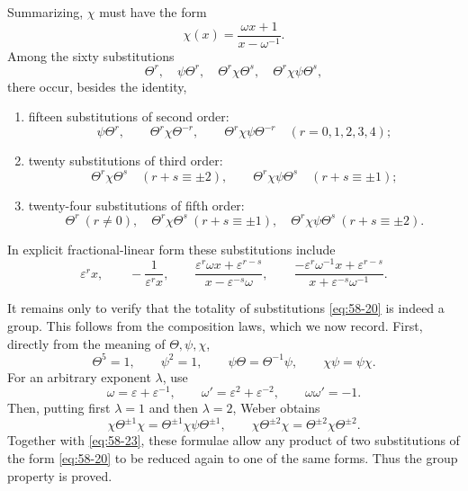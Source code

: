 \documentclass[11pt,a4paper]{book}
\newcommand{\eps}{\varepsilon}
\begin{document}
Summarizing, \(\chi\) must have the form
\begin{equation}\label{eq:58-19}
 \chi(x)=\frac{\omega x+1}{x-\omega^{-1}}.
\end{equation}
Among the sixty substitutions
\begin{equation}\label{eq:58-20}
 \Theta^r,
 \quad \psi\Theta^r,
 \quad \Theta^r\chi\Theta^s,
 \quad \Theta^r\chi\psi\Theta^s,
\end{equation}
there occur, besides the identity,
\begin{enumerate}[label=\arabic*.]
\item fifteen substitutions of second order:
\[
 \psi\Theta^r,
 \qquad \Theta^r\chi\Theta^{-r},
 \qquad \Theta^r\chi\psi\Theta^{-r}
 \quad (r=0,1,2,3,4);
\]
\item twenty substitutions of third order:
\[
 \Theta^r\chi\Theta^s\quad(r+s\equiv\pm2),
 \qquad
 \Theta^r\chi\psi\Theta^s\quad(r+s\equiv\pm1);
\]
\item twenty-four substitutions of fifth order:
\[
 \Theta^r\ (r\ne0),
 \quad \Theta^r\chi\Theta^s\ (r+s\equiv\pm1),
 \quad \Theta^r\chi\psi\Theta^s\ (r+s\equiv\pm2).
\]
\end{enumerate}
In explicit fractional-linear form these substitutions include
\begin{equation}\label{eq:58-22}
 \eps^r x,
 \qquad -\frac{1}{\eps^r x},
 \qquad
 \frac{\eps^r\omega x+\eps^{r-s}}{x-\eps^{-s}\omega},
 \qquad
 \frac{-\eps^r\omega^{-1}x+\eps^{r-s}}{x+\eps^{-s}\omega^{-1}}.
\end{equation}

It remains only to verify that the totality of substitutions \eqref{eq:58-20} is indeed a group.  This follows from the composition laws, which we now record.  First, directly from the meaning of \(\Theta,\psi,\chi\),
\begin{equation}\label{eq:58-23}
 \Theta^5=1,
 \qquad \psi^2=1,
 \qquad \psi\Theta=\Theta^{-1}\psi,
 \qquad \chi\psi=\psi\chi.
\end{equation}
For an arbitrary exponent \(\lambda\), use
\begin{equation}\label{eq:58-24}
 \omega=\eps+\eps^{-1},
 \qquad \omega'=\eps^2+\eps^{-2},
 \qquad \omega\omega'=-1.
\end{equation}
Then, putting first \(\lambda=1\) and then \(\lambda=2\), Weber obtains
\begin{equation}\label{eq:58-25}
 \chi\Theta^{\pm1}\chi=\Theta^{\pm1}\chi\psi\Theta^{\pm1},
 \qquad
 \chi\Theta^{\pm2}\chi=\Theta^{\pm2}\chi\Theta^{\pm2}.
\end{equation}
Together with \eqref{eq:58-23}, these formulae allow any product of two substitutions of the form \eqref{eq:58-20} to be reduced again to one of the same forms.  Thus the group property is proved.
\end{document}
